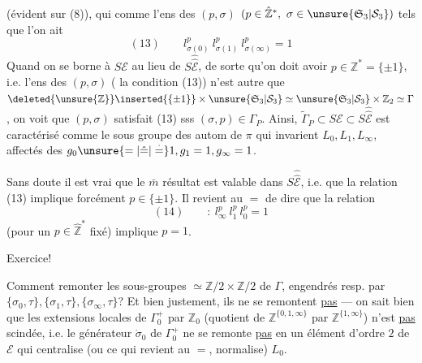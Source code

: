(évident sur (8)), qui  comme l'ens des $(p,\sigma)$ $(p\in\hat{\mathbb Z}^*,\ \sigma\in\unsure{\mathfrak S_3|\mathcal S_3})$ tels que l'on ait
\[
(13)\qquad l_{\sigma(0)}^p\ l_{\sigma(1)}^p\ l_{\sigma(\infty)}^p=1
\]
Quand on se borne à $S\mathcal E$ au lieu de $S\widehat{\widehat{\mathcal E}}$, de sorte qu'on doit avoir $p\in\mathbb Z^*=\{\pm1\}$,  i.e. l'ens des $(p,\sigma)$ ( la condition (13)) n'est autre que $\deleted{\unsure{\mathbb Z}}\inserted{\{\pm1\}}\times\unsure{\mathfrak S_3|\mathcal S_3}\simeq\unsure{\mathfrak S_3|\mathcal S_3}\times\mathbb Z_2\simeq\Gamma$, on voit que $(p,\sigma)$ satisfait (13) sss $(\sigma,p)\in\Gamma_P$. Ainsi, $\tilde\Gamma_P\subset S\mathcal E\subset S\widehat{\widehat{\mathcal E}}$ est caractérisé comme le sous groupe  des autom de $\pi$  qui invarient $L_0,L_1,L_\infty$, affectés des  $g_0\unsure{=|\hat{=}|\overset{\cdot}{=}}1,g_1=1,g_\infty=1$.

Sans doute il est vrai que le $\bar m$ résultat est valable dans $S\widehat{\widehat{\mathcal E}}$, i.e. que la relation (13) implique forcément $p\in\{\pm1\}$. Il revient au $=$ de dire  que la relation
\[
(14)\qquad :\ l_\infty^p\ l_1^p\ l_0^p=1
\]
(pour un $p\in\hat{\mathbb Z}^*$ fixé) implique $p=1$.

Exercice!

Comment remonter les sous-groupes  $\simeq\mathbb Z/2\times\mathbb Z/2$ de $\Gamma$, engendrés resp. par $\{\sigma_0,\tau\},\{\sigma_1,\tau\},\{\sigma_\infty,\tau\}$? Et bien justement, ils ne se remontent \uline{pas} --- on sait bien que les extensions locales de $\Gamma_0^+$  par $\mathbb Z_0$ (quotient de $\mathbb Z^{\{0,1,\infty\}}$ par $\mathbb Z^{\{1,\infty\}}$) n'est \uline{pas} scindée, i.e. le générateur $\dot\sigma_0$ de $\Gamma_0^+$ ne se remonte \uline{pas} en un élément d'ordre $2$ de $\mathcal E$ qui centralise (ou ce qui revient au $=$, normalise) $L_0$.

